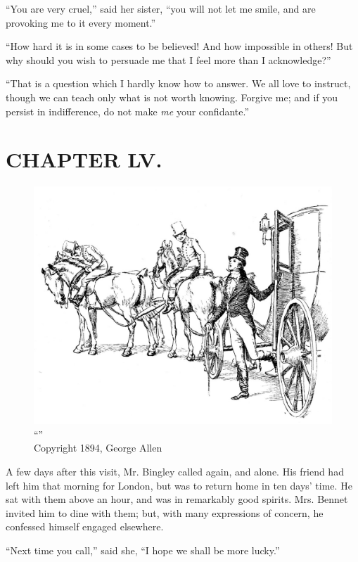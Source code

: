 ``You are very cruel,'' said her sister, ``you will not let me smile, and are provoking me to it every moment.''

``How hard it is in some cases to be believed! And how impossible in others! But why should you wish to persuade me that I feel more than I acknowledge?''

``That is a question which I hardly know how to answer. We all love to instruct, though we can teach only what is not worth knowing. Forgive me; and if you persist in indifference, do not make \textit{me} your confidante.''



\chapter{CHAPTER LV.}

\begin{figure}[htbp]
    \centering
    \includegraphics[width=\textwidth]{illustrations/i_031.jpg}
    \caption{“”\\ Copyright 1894, George Allen}
    \label{fig:image}
\end{figure}


A few days after this visit, Mr. Bingley called again, and alone. His friend had left him that morning for London, but was to return home in ten days' time. He sat with them above an hour, and was in remarkably good spirits. Mrs. Bennet invited him to dine with them; but, with many expressions of concern, he confessed himself engaged elsewhere.

``Next time you call,'' said she, ``I hope we shall be more lucky.''


